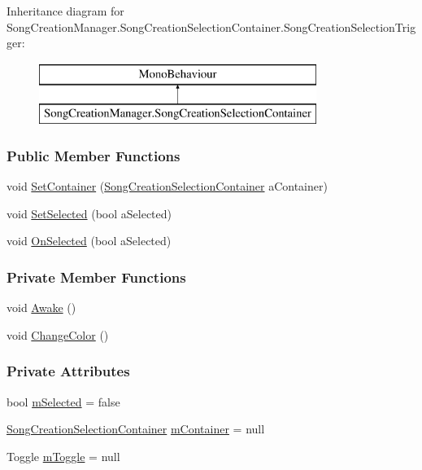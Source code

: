 Inheritance diagram for Song\+Creation\+Manager.\+Song\+Creation\+Selection\+Container.\+Song\+Creation\+Selection\+Trigger\+:\begin{figure}[H]
\begin{center}
\leavevmode
\includegraphics[height=2.000000cm]{group___s_c_m_nest_class}
\end{center}
\end{figure}
\subsubsection*{Public Member Functions}
\begin{DoxyCompactItemize}
\item 
void \hyperlink{group___s_c_m_nest_class_a29f496763424eb274f35cd29330583ac}{Set\+Container} (\hyperlink{group___s_c_m_nest_class_class_song_creation_manager_1_1_song_creation_selection_container}{Song\+Creation\+Selection\+Container} a\+Container)
\item 
void \hyperlink{group___s_c_m_nest_class_a0d65cd109a370034f580d63e823725b9}{Set\+Selected} (bool a\+Selected)
\item 
void \hyperlink{group___s_c_m_nest_class_a6477d6c5056af7998063e90e282b67ae}{On\+Selected} (bool a\+Selected)
\end{DoxyCompactItemize}
\subsubsection*{Private Member Functions}
\begin{DoxyCompactItemize}
\item 
void \hyperlink{group___s_c_m_nest_class_ae7264acac3310f5db50df38467734c06}{Awake} ()
\item 
void \hyperlink{group___s_c_m_nest_class_a26bd7667a86c8dc85429a5e4798dd30a}{Change\+Color} ()
\end{DoxyCompactItemize}
\subsubsection*{Private Attributes}
\begin{DoxyCompactItemize}
\item 
bool \hyperlink{group___s_c_m_nest_class_a1a8086defe08acc773bdc9385a9f66d2}{m\+Selected} = false
\item 
\hyperlink{group___s_c_m_nest_class_class_song_creation_manager_1_1_song_creation_selection_container}{Song\+Creation\+Selection\+Container} \hyperlink{group___s_c_m_nest_class_aae8ebcbfe18ad8706d11edac54f2da87}{m\+Container} = null
\item 
Toggle \hyperlink{group___s_c_m_nest_class_ad548c27e148377da02160715a0aca9ee}{m\+Toggle} = null
\end{DoxyCompactItemize}


